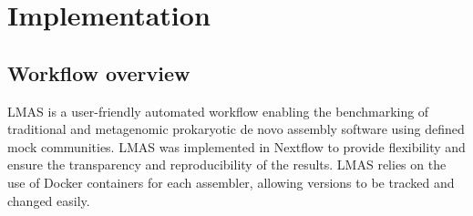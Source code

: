 \section{Implementation}

\subsection{Workflow overview}

LMAS is a user-friendly automated workflow enabling the benchmarking of traditional and metagenomic prokaryotic de novo assembly software using defined mock communities. LMAS was implemented in Nextflow \cite{di_tommaso_nextflow_2017} to provide flexibility and ensure the transparency and reproducibility of the results. LMAS relies on the use of Docker \cite{merkel_docker_2014} containers for each assembler, allowing versions to be tracked and changed easily.

